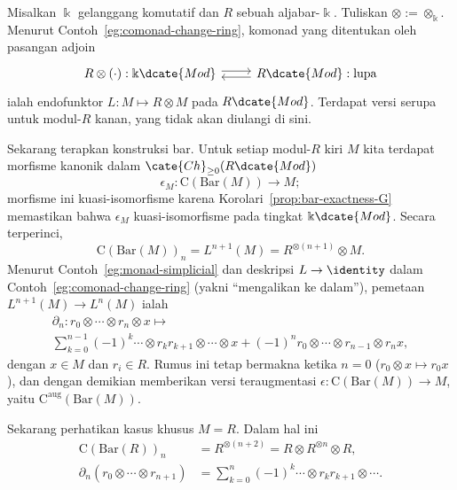\begin{example}\label{eg:HH-comonad}
	Misalkan $\Bbbk$ gelanggang komutatif dan $R$ sebuah aljabar-$\Bbbk$.
	Tuliskan $\otimes:=\otimes_{\Bbbk}$. Menurut
	Contoh~\ref{eg:comonad-change-ring}, komonad yang ditentukan oleh
	pasangan adjoin
	\[\begin{tikzcd}
		R \otimes (\cdot): \Bbbk\dcate{Mod} \arrow[shift left, r] & R\dcate{Mod}: \text{lupa} \arrow[shift left, l]
	\end{tikzcd}\]
	ialah endofunktor $L:M\mapsto R\otimes M$ pada $R\dcate{Mod}$. Terdapat
	versi serupa untuk modul-$R$ kanan, yang tidak akan
	diulangi di sini.

	Sekarang terapkan konstruksi bar. Untuk setiap modul-$R$ kiri $M$ kita
	terdapat morfisme kanonik dalam
	$\cate{Ch}_{\geq0}(R\dcate{Mod})$
	\[ \epsilon_M: \mathrm{C}(\mathrm{Bar}(M)) \to M; \]
	morfisme ini kuasi-isomorfisme karena
	Korolari~\ref{prop:bar-exactness-G} memastikan bahwa $\epsilon_M$
	kuasi-isomorfisme pada tingkat $\Bbbk\dcate{Mod}$. Secara terperinci,
	\[ \mathrm{C}(\mathrm{Bar}(M))_n = L^{n+1}(M) = R^{\otimes (n+1)} \otimes M. \]
	Menurut Contoh~\ref{eg:monad-simplicial} dan deskripsi
	$L\to\identity$ dalam Contoh~\ref{eg:comonad-change-ring} (yakni
	``mengalikan ke dalam''), pemetaan $L^{n+1}(M)\to L^n(M)$ ialah
	\begin{multline*}
		\partial_n: r_0 \otimes \cdots \otimes r_n \otimes x \mapsto \\
		\sum_{k=0}^{n-1} (-1)^k \cdots \otimes r_k r_{k+1} \otimes \cdots \otimes x + (-1)^n r_0 \otimes \cdots \otimes r_{n-1} \otimes r_n x,
	\end{multline*}
	dengan $x\in M$ dan $r_i\in R$. Rumus ini tetap bermakna ketika
	$n=0$ ($r_0\otimes x\mapsto r_0x$), dan dengan demikian memberikan
	versi teraugmentasi $\epsilon:\mathrm{C}(\mathrm{Bar}(M))\to M$,
	yaitu $\mathrm{C}^{\mathrm{aug}}(\mathrm{Bar}(M))$.

	Sekarang perhatikan kasus khusus $M=R$. Dalam hal ini
	\begin{align*}
		\mathrm{C}(\mathrm{Bar}(R))_n & = R^{\otimes (n+2)} = R \otimes R^{\otimes n} \otimes R, \\
		\partial_n(r_0 \otimes \cdots \otimes r_{n+1}) & = \sum_{k=0}^n (-1)^k \cdots \otimes r_k r_{k+1} \otimes \cdots.
	\end{align*}


\end{example}
